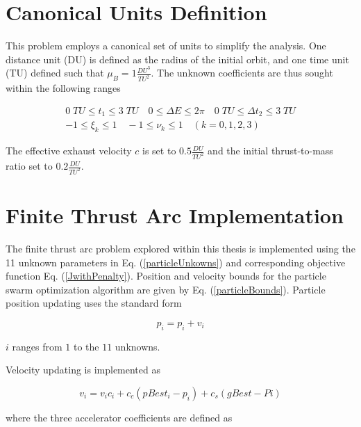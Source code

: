 \section{Canonical Units Definition}

\noindent This problem employs a canonical set of units to simplify the analysis. One distance unit (DU) is defined as the radius of the initial orbit,
and one time unit (TU) defined such that $\mu_B = 1 \frac{DU^3}{TU^2}$. The unknown coefficients are thus sought within the following ranges

\begin{equation}
\label{particleBounds}
\begin{gathered}
0 \; TU \leq t_1 \leq 3 \; TU \quad 0 \leq \Delta E \leq 2\pi \quad 0 \; TU \leq \Delta t_2 \leq 3 \; TU \\
-1 \leq \xi_k \leq 1 \quad -1 \leq \nu_k \leq 1 \quad (k = 0,1,2,3)
\end{gathered}
\end{equation}

\noindent The effective exhaust velocity $c$ is set to $0.5 \frac{DU}{TU^2}$ and the initial thrust-to-mass ratio set to $0.2 \frac{DU}{TU^2}$. 


\section{Finite Thrust Arc Implementation}

\noindent The finite thrust arc problem explored within this thesis is implemented using the 11 unknown parameters in Eq. (\ref{particleUnkowns})
and corresponding objective function Eq. (\ref{JwithPenalty}). Position and velocity bounds for the particle swarm optimization algorithm are given by Eq. (\ref{particleBounds}). Particle position updating uses 
the standard form

\begin{equation}
    \label{positionUpdating}
p_i = p_i+v_i
\end{equation}

\noindent $i$ ranges from $1$ to the $11$ unknowns. \newline

\noindent Velocity updating is implemented as

\begin{equation}
    \label{eq:velocityUpdating}
v_i = v_ic_i+c_c(pBest_i-p_i)+c_s(gBest-Pi)
\end{equation}

\noindent where the three accelerator coefficients are defined as

